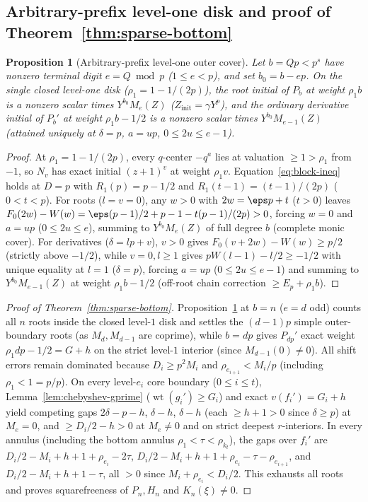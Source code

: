 \documentclass[11pt,reqno]{amsart}
\numberwithin{equation}{section}
\newtheorem{proposition}[theorem]{Proposition}
\theoremstyle{definition}
\theoremstyle{remark}
\newcommand{\wt}{\operatorname{wt}}
\begin{document}
\subsection{Arbitrary-prefix level-one disk and proof of Theorem~\ref{thm:sparse-bottom}}

\begin{proposition}[Arbitrary-prefix level-one outer cover]
\label{prop:level1-cover}
Let $b = Qp < p^s$ have nonzero terminal digit $e = Q\bmod p$ ($1\le e<p$), and set $b_0=b-ep$. On the single closed level-one disk ($\rho_1=1-1/(2p)$), the root initial of $P_b$ at weight $\rho_1 b$ is a nonzero scalar times $Y^{b_0}M_e(Z)$ ($Z_{\mathrm{init}}=\gamma Y^p$), and the ordinary derivative initial of $P_b'$ at weight $\rho_1 b - 1/2$ is a nonzero scalar times $Y^{b_0}M_{e-1}(Z)$ (attained uniquely at $\delta=p$, $a=up$, $0\le 2u\le e-1$).
\end{proposition}

\begin{proof}
At $\rho_1=1-1/(2p)$, every $q$-center $-q^a$ lies at valuation $\ge 1 > \rho_1$ from $-1$, so $N_v$ has exact initial $(z+1)^v$ at weight $\rho_1 v$. Equation~\eqref{eq:block-ineq} holds at $D=p$ with $R_1(p)=p-1/2$ and $R_1(t-1)=(t-1)/(2p)$ ($0<t<p$). For roots ($l=v=0$), any $w>0$ with $2w=\eps p+t$ ($t>0$) leaves $F_0(2w)-W(w) = \eps(p-1)/2 + p - 1 - t(p-1)/(2p) > 0$, forcing $w=0$ and $a=up$ ($0\le 2u\le e$), summing to $Y^{b_0}M_e(Z)$ of full degree $b$ (complete monic cover). For derivatives ($\delta=lp+v$), $v>0$ gives $F_0(v+2w)-W(w)\ge p/2$ (strictly above $-1/2$), while $v=0, l\ge 1$ gives $pW(l-1)-l/2 \ge -1/2$ with unique equality at $l=1$ ($\delta=p$), forcing $a=up$ ($0\le 2u\le e-1$) and summing to $Y^{b_0}M_{e-1}(Z)$ at weight $\rho_1 b - 1/2$ (off-root chain correction $\ge E_p + \rho_1 b$).
\end{proof}

\begin{proof}[Proof of Theorem~\ref{thm:sparse-bottom}]
Proposition~\ref{prop:level1-cover} at $b=n$ ($e=d$ odd) counts all $n$ roots inside the closed level-$1$ disk and settles the $(d-1)p$ simple outer-boundary roots (as $M_d, M_{d-1}$ are coprime), while $b=dp$ gives $P_{dp}'$ exact weight $\rho_1 dp - 1/2 = G+h$ on the strict level-$1$ interior (since $M_{d-1}(0)\ne 0$). All shift errors remain dominated because $D_i\ge p^2 M_i$ and $\rho_{e_{i+1}} < M_i/p$ (including $\rho_1 < 1 = p/p$). On every level-$e_i$ core boundary ($0\le i\le t$), Lemma~\ref{lem:chebyshev-gprime} ($\wt(g_i')\ge G_i$) and exact $v(f_i')=G_i+h$ yield competing gaps $2\delta-p-h$, $\delta-h$, $\delta-h$ (each $\ge h+1 > 0$ since $\delta\ge p$) at $M_e=0$, and $\ge D_i/2 - h > 0$ at $M_e\ne 0$ and on strict deepest $r$-interiors. In every annulus (including the bottom annulus $\rho_1 < \tau < \rho_{k_t}$), the gaps over $f_i'$ are $D_i/2 - M_i + h + 1 + \rho_{e_i} - 2\tau$, $D_i/2 - M_i + h + 1 + \rho_{e_i} - \tau - \rho_{e_{i+1}}$, and $D_i/2 - M_i + h + 1 - \tau$, all $>0$ since $M_i+\rho_{e_i} < D_i/2$. This exhausts all roots and proves squarefreeness of $P_n, H_n$ and $K_n(\xi)\ne 0$.
\end{proof}
\end{document}

